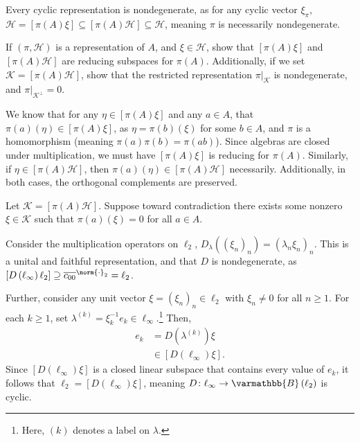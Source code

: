 \documentclass[10pt]{mypackage}
\renewcommand*{\mathbb}[1]{\varmathbb{#1}}
\newcommand{\B}{\mathbb{B}}
\begin{document}
Every cyclic representation is nondegenerate, as for any cyclic vector $\xi_{\pi}$, $\mathcal{H} = \left[\pi(A)\xi\right]\subseteq \left[\pi(A)\mathcal{H}\right]\subseteq \mathcal{H}$, meaning $\pi$ is necessarily nondegenerate.
\begin{exercise}
  If $\left(\pi,\mathcal{H}\right)$ is a representation of $A$, and $\xi\in \mathcal{H}$, show that $\left[\pi(A)\xi\right]$ and $\left[\pi(A)\mathcal{H}\right]$ are reducing subspaces for $\pi(A)$. Additionally, if we set $\mathcal{K} = \left[\pi(A)\mathcal{H}\right]$, show that the restricted representation $\pi|_{\mathcal{K}}$ is nondegenerate, and $\pi|_{\mathcal{K}^{\perp}} = 0$.
\end{exercise}
\begin{solution}
  We know that for any $\eta\in \left[\pi(A)\xi\right]$ and any $a\in A$, that $\pi(a)\left(\eta\right)\in \left[\pi(A)\xi\right]$, as $\eta = \pi(b)\left(\xi\right)$ for some $b\in A$, and $\pi$ is a homomorphism (meaning $\pi(a)\pi(b) = \pi(ab)$). Since algebras are closed under multiplication, we must have $\left[\pi(A)\xi\right]$ is reducing for $\pi(A)$. Similarly, if $\eta\in \left[\pi(A)\mathcal{H}\right]$, then $\pi(a)\left(\eta\right)\in \left[\pi(A)\mathcal{H}\right]$ necessarily. Additionally, in both cases, the orthogonal complements are preserved.\newline

  Let $\mathcal{K} = \left[\pi(A)\mathcal{H}\right]$. Suppose toward contradiction there exists some nonzero $\xi\in \mathcal{K}$ such that $\pi(a)\left(\xi\right) = 0$ for all $a\in A$. 
\end{solution}
\begin{example}
  Consider the multiplication operators on $\ell_2$, $D_{\lambda}\left(\left(\xi_n\right)_n\right) = \left(\lambda_n\xi_n\right)_n$. This is a unital and faithful representation, and that $D$ is nondegenerate, as $\left[D\left(\ell_{\infty}\right)\ell_2\right] \supseteq \overline{c_{00}}^{\norm{\cdot}_2} = \ell_2$.\newline

  Further, consider any unit vector $\xi = \left(\xi_n\right)_n\in \ell_2$ with $\xi_n \neq 0$ for all $n\geq 1$. For each $k\geq 1$, set $\lambda^{(k)} = \xi_k^{-1}e_k\in \ell_{\infty}$.\footnote{Here, $(k)$ denotes a label on $\lambda$.} Then,
  \begin{align*}
    e_k &= D\left(\lambda^{(k)}\right)\xi\\
        &\in \left[D\left(\ell_{\infty}\right)\xi\right].
  \end{align*}
  Since $\left[D\left(\ell_{\infty}\right)\xi\right]$ is a closed linear subspace that contains every value of $e_k$, it follows that $\ell_2 = \left[D\left(\ell_{\infty}\right)\xi\right]$, meaning $D\colon \ell_{\infty}\rightarrow \B\left(\ell_2\right)$ is cyclic.
\end{example}
\end{document}
